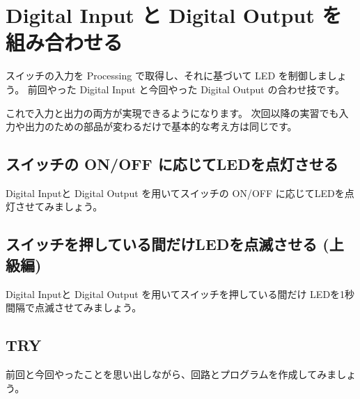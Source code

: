 \documentclass[11pt,a4paper]{jarticle}
\begin{document}
\section{Digital Input と Digital Output を組み合わせる}
スイッチの入力を Processing で取得し、それに基づいて LED を制御しましょう。
前回やった Digital Input と今回やった Digital Output の合わせ技です。

これで入力と出力の両方が実現できるようになります。
次回以降の実習でも入力や出力のための部品が変わるだけで基本的な考え方は同じです。

\subsection{スイッチの ON/OFF に応じてLEDを点灯させる}
Digital Inputと Digital Output を用いてスイッチの ON/OFF に応じてLEDを点灯させてみましょう。

\subsection{スイッチを押している間だけLEDを点滅させる (上級編) }
Digital Inputと Digital Output を用いてスイッチを押している間だけ LEDを1秒間隔で点滅させてみましょう。

\subsection*{TRY}
前回と今回やったことを思い出しながら、回路とプログラムを作成してみましょう。
\end{document}
